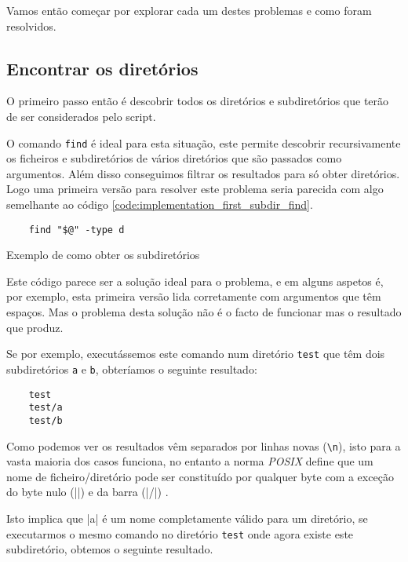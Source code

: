 Vamos então começar por explorar cada um destes problemas e como foram resolvidos.

\subsection{Encontrar os diretórios}

O primeiro passo então é descobrir todos os diretórios e subdiretórios que terão
de ser considerados pelo script.

O comando \Verb|find| é ideal para esta situação, este permite descobrir
recursivamente os ficheiros e subdiretórios de vários diretórios que são
passados como argumentos. Além disso conseguimos filtrar os resultados para só
obter diretórios. Logo uma primeira versão para resolver este problema seria
parecida com algo semelhante ao código
\ref{code:implementation_first_subdir_find}.

\begin{listing}[H]
	\centering
	\begin{verbatim}
    find "$@" -type d
  \end{verbatim}
	\caption{Exemplo de como obter os subdiretórios}
	\label{code:implementation_first_subdir_find}
\end{listing}

Este código parece ser a solução ideal para o problema, e em alguns aspetos é,
por exemplo, esta primeira versão lida corretamente com argumentos que têm
espaços. Mas o problema desta solução não é o facto de funcionar mas o resultado
que produz.

Se por exemplo, executássemos este comando num diretório \Verb|test| que têm
dois subdiretórios \Verb|a| e \Verb|b|, obteríamos o seguinte resultado:

\begin{listing}[H]
	\centering
	\begin{verbatim}
    test
    test/a
    test/b
  \end{verbatim}
	\cprotect\caption{Exemplo do resutlado obtido pelo \Verb|find|}
\end{listing}

Como podemos ver os resultados vêm separados por linhas novas (\Verb|\n|), isto
para a vasta maioria dos casos funciona, no entanto a norma \emph{POSIX} define
que um nome de ficheiro/diretório pode ser constituído por qualquer byte com a
exceção do byte nulo (\bashinline|\0|) e da barra (\bashinline|/|)
\cite{posix_path}.

Isto implica que \bashinline|a\nd| é um nome completamente válido para um diretório,
se executarmos o mesmo comando no diretório \Verb|test| onde agora existe este
subdiretório, obtemos o seguinte resultado.


